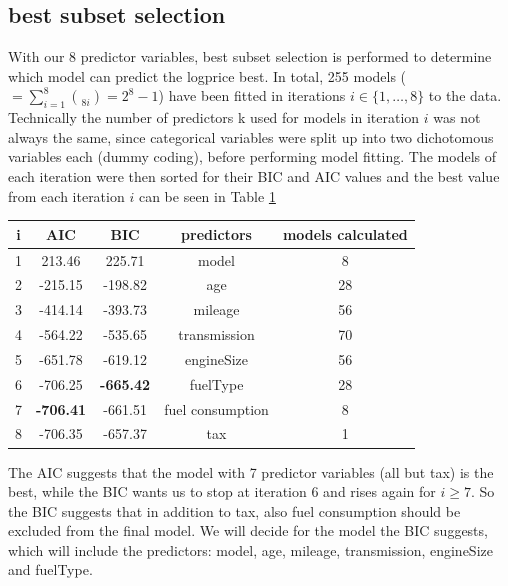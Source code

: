 \documentclass[12 pt]{scrartcl}
\begin{document}
\subsection{best subset selection}

With our 8 predictor variables, best subset selection is performed to determine which model can predict the logprice best.
In total, 255 models ($= \sum_{i=1}^8{\choose{8}{i}} = 2^8-1$) have been fitted in iterations $i \in \{1,\dots,8\}$ to the data. Technically the number of predictors k used for models in iteration $i$ was not always the same, since categorical variables were split up into two dichotomous variables each (dummy coding), before performing model fitting. The models of each iteration were then sorted for their BIC and AIC values and the best value from each iteration $i$ can be seen in Table \ref{tab:subsetselection}

\begin{table}[ht]
  \centering
  \label{tab:subsetselection}
  \begin{tabular}{c|cccc}
    i & AIC              & BIC              & predictors       & models calculated \\
    \hline
    1 & 213.46           & 225.71           & model            & 8                 \\
    2 & -215.15          & -198.82          & age              & 28                \\
    3 & -414.14          & -393.73          & mileage          & 56                \\
    4 & -564.22          & -535.65          & transmission     & 70                \\
    5 & -651.78          & -619.12          & engineSize       & 56                \\
    6 & -706.25          & \textbf{-665.42} & fuelType         & 28                \\
    7 & \textbf{-706.41} & -661.51          & fuel consumption & 8                 \\
    8 & -706.35          & -657.37          & tax              & 1                 \\
  \end{tabular}
\end{table}

The AIC suggests that the model with 7 predictor variables (all but tax) is the best, while the BIC wants us to stop at iteration 6 and rises again for $i\ge7$. So the BIC suggests that in addition to tax, also fuel consumption should be excluded from the final model.
We will decide for the model the BIC suggests, which will include the predictors: model, age, mileage, transmission, engineSize and fuelType.
\end{document}
